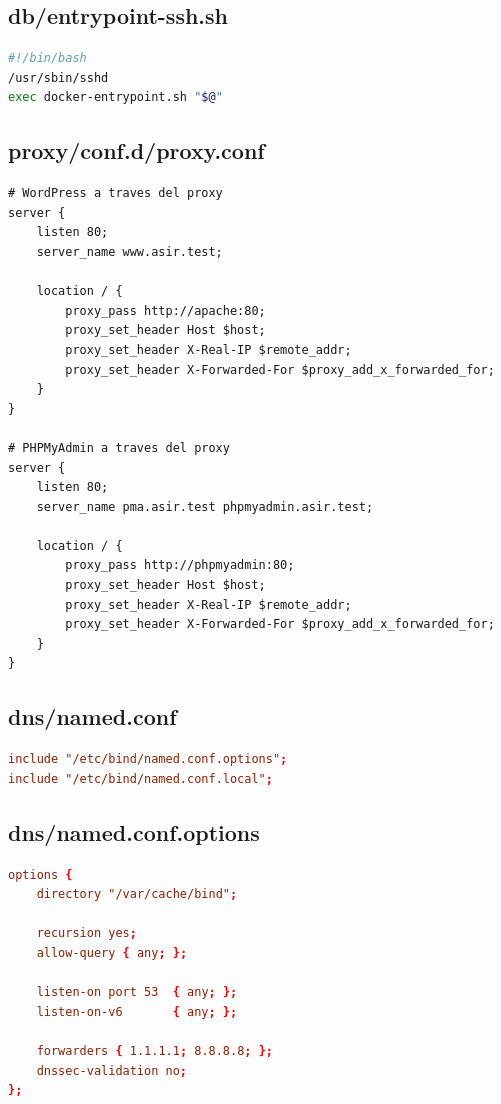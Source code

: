 \documentclass[11pt]{article}
\begin{document}
\subsection{db/entrypoint-ssh.sh}
\label{sec:org0000081}

\begin{lstlisting}[language=bash,numbers=none]
#!/bin/bash
/usr/sbin/sshd
exec docker-entrypoint.sh "$@"
\end{lstlisting}
\subsection{proxy/conf.d/proxy.conf}
\label{sec:org0000084}

\begin{lstlisting}[language=nginx,numbers=none]
# WordPress a traves del proxy
server {
    listen 80;
    server_name www.asir.test;

    location / {
        proxy_pass http://apache:80;
        proxy_set_header Host $host;
        proxy_set_header X-Real-IP $remote_addr;
        proxy_set_header X-Forwarded-For $proxy_add_x_forwarded_for;
    }
}

# PHPMyAdmin a traves del proxy
server {
    listen 80;
    server_name pma.asir.test phpmyadmin.asir.test;

    location / {
        proxy_pass http://phpmyadmin:80;
        proxy_set_header Host $host;
        proxy_set_header X-Real-IP $remote_addr;
        proxy_set_header X-Forwarded-For $proxy_add_x_forwarded_for;
    }
}
\end{lstlisting}
\subsection{dns/named.conf}
\label{sec:org0000087}

\begin{lstlisting}[language=conf,numbers=none]
include "/etc/bind/named.conf.options";
include "/etc/bind/named.conf.local";
\end{lstlisting}
\subsection{dns/named.conf.options}
\label{sec:org000008a}

\begin{lstlisting}[language=conf,numbers=none]
options {
    directory "/var/cache/bind";

    recursion yes;
    allow-query { any; };

    listen-on port 53  { any; };
    listen-on-v6       { any; };

    forwarders { 1.1.1.1; 8.8.8.8; };
    dnssec-validation no;
};
\end{lstlisting}
\end{document}
